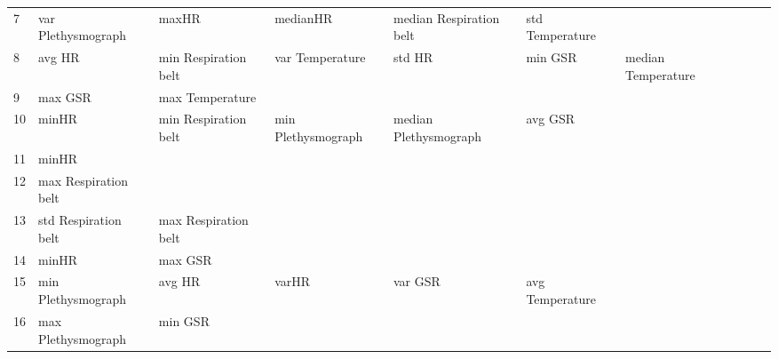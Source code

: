 \begin{landscape}
\begin{table}[]
\begin{tabular}{l|llllllll}
7        & var Plethysmograph      & maxHR                 & medianHR                & median Respiration belt & std Temperature         &                       &                      &          &                      &        \\
8        & avg HR                  & min Respiration belt  & var Temperature         & std HR                  & min GSR                 & median Temperature    &                      &          &                      &        \\
9        & max GSR                 & max Temperature       &                         &                         &                         &                       &                      &          &                      &        \\
10       & minHR                   & min Respiration belt  & min Plethysmograph      & median Plethysmograph   & avg GSR                 &                       &                      &          &                      &        \\
11       & minHR                   &                       &                         &                         &                         &                       &                      &          &                      &        \\
12       & max Respiration belt    &                       &                         &                         &                         &                       &                      &          &                      &        \\
13       & std Respiration belt    & max Respiration belt  &                         &                         &                         &                       &                      &          &                      &        \\
14       & minHR                   & max GSR               &                         &                         &                         &                       &                      &          &                      &        \\
15       & min Plethysmograph      & avg HR                & varHR                   & var GSR                 & avg Temperature         &                       &                      &          &                      &        \\
16       & max Plethysmograph      & min GSR               &                         &                         &                         &                       &                      &          &                      &        \\

\end{tabular}
\end{table}
\end{landscape}
